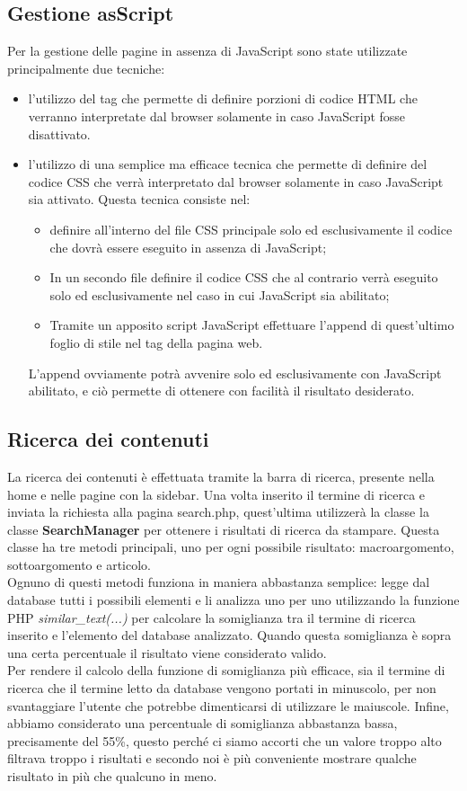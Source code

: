 \documentclass[12pt]{article}
\begin{document}
	\subsection{Gestione asScript}
	Per la gestione delle pagine in assenza di JavaScript sono state utilizzate principalmente due tecniche:
	\begin{itemize}
			\item l'utilizzo del tag  che permette di definire porzioni di codice HTML che verranno interpretate dal browser solamente in caso JavaScript fosse disattivato.
			\item l'utilizzo di una semplice ma efficace tecnica che permette di definire del codice CSS che verrà interpretato dal browser solamente in caso JavaScript sia attivato. Questa tecnica consiste nel:
			\begin{itemize}
				\item definire all'interno del file CSS principale solo ed esclusivamente il codice che dovrà essere eseguito in assenza di JavaScript;
				\item In un secondo file definire il codice CSS che al contrario verrà eseguito solo ed esclusivamente nel caso in cui JavaScript sia abilitato;
				\item Tramite un apposito script JavaScript effettuare l'append di quest'ultimo foglio di stile nel tag  della pagina web.
			\end{itemize}
			L'append ovviamente potrà avvenire solo ed esclusivamente con JavaScript abilitato, e ciò permette di ottenere con facilità il risultato desiderato.
	\end{itemize}

	\subsection{Ricerca dei contenuti}
	La ricerca dei contenuti è effettuata tramite la barra di ricerca, presente nella home e nelle pagine con la sidebar. Una volta inserito il termine di ricerca e inviata la richiesta alla pagina search.php, quest'ultima utilizzerà la classe la classe \textbf{SearchManager} per ottenere i risultati di ricerca da stampare. Questa classe ha tre metodi principali, uno per ogni possibile risultato: macroargomento, sottoargomento e articolo. \\
Ognuno di questi metodi funziona in maniera abbastanza semplice: legge dal database tutti i possibili elementi e li analizza uno per uno utilizzando la funzione PHP \textit{similar\_text(...)} per calcolare la somiglianza tra il termine di ricerca inserito e l'elemento del database analizzato. Quando questa somiglianza è sopra una certa percentuale il risultato viene considerato valido. \\
Per rendere il calcolo della funzione di somiglianza più efficace, sia il termine di ricerca che il termine letto da database vengono portati in minuscolo, per non svantaggiare l'utente che potrebbe dimenticarsi di utilizzare le maiuscole. Infine, abbiamo considerato una percentuale di somiglianza abbastanza bassa, precisamente del 55\%, questo perché ci siamo accorti che un valore troppo alto filtrava troppo i risultati e secondo noi è più conveniente mostrare qualche risultato in più che qualcuno in meno.
	
\end{document}
